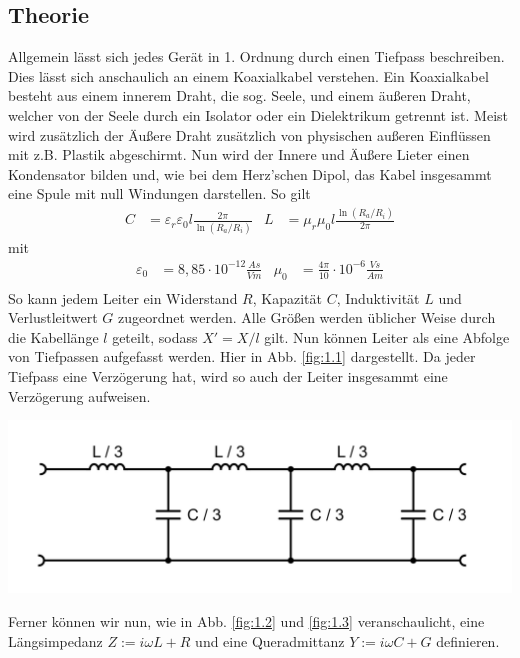 \documentclass[10pt]{article}
\newenvironment{Figure}
  {\par\medskip\noindent\minipage{\linewidth}}
  {\endminipage\par\medskip}
\begin{document}
\begin{multicols}{2}
	\section{\large Theorie}
	Allgemein lässt sich jedes Gerät in 1. Ordnung durch einen Tiefpass beschreiben. Dies lässt sich anschaulich an einem Koaxialkabel verstehen. Ein Koaxialkabel besteht aus einem innerem Draht, die sog. Seele, und einem äußeren Draht, welcher von der Seele durch ein Isolator oder ein Dielektrikum getrennt ist. Meist wird zusätzlich der Äußere Draht zusätzlich von physischen außeren Einflüssen mit z.B. Plastik abgeschirmt. Nun wird der Innere und Äußere Lieter einen Kondensator bilden und, wie bei dem Herz'schen Dipol, das Kabel insgesammt eine Spule mit null Windungen darstellen.
	So gilt
	\begin{align*}
		C & = \varepsilon_r \varepsilon_0 l \frac{2\pi}{\ln\left(R_a/R_i\right)} & L & = \mu_r \mu_0 l \frac{\ln\left(R_a/R_i\right)}{2\pi}
	\end{align*}
	mit
	\begin{align*}
		\varepsilon_0 & = 8{,}85 \cdot 10^{-12} \frac{As}{Vm} & \mu_0 & = \frac{4\pi}{10} \cdot 10^{-6} \frac{Vs}{Am} \\
	\end{align*}
	So kann jedem Leiter ein Widerstand \(R\), Kapazität \(C\), Induktivität \(L\) und Verlustleitwert \(G\) zugeordnet werden. Alle Größen werden üblicher Weise durch die Kabellänge \(l\) geteilt, sodass \(X' = X/l\) gilt.
	Nun können Leiter als eine Abfolge von Tiefpassen aufgefasst werden. Hier in Abb. \ref{fig:1.1} dargestellt. Da jeder Tiefpass eine Verzögerung hat, wird so auch der Leiter insgesammt eine Verzögerung aufweisen.
	\begin{Figure}
		\centering
		\includegraphics[width=0.9\linewidth]{Leitungsmodell.png}
		\label{fig:1.1}
	\end{Figure}
	Ferner können wir nun, wie in Abb. \ref{fig:1.2} und \ref{fig:1.3} veranschaulicht, eine Längsimpedanz \(Z := i\omega L + R\)  und eine Queradmittanz \(Y := i\omega C + G\) definieren.
	\begin{Figure}

\end{Figure}
\end{multicols}
\end{document}
